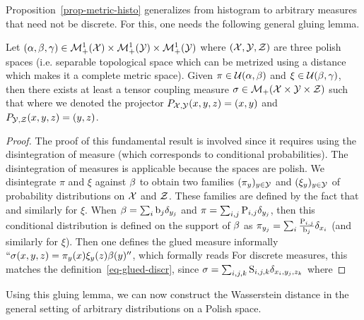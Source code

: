 Proposition~\ref{prop-metric-histo} generalizes from histogram to arbitrary measures that need not be discrete. For this, one needs the following general gluing lemma.

\begin{lem}\label{lem-gluing-general}
	Let $(\alpha,\beta,\gamma) \in \mathcal{M}_+^1(\mathcal{X}) \times \mathcal{M}_+^1(\mathcal{Y}) \times \mathcal{M}_+^1(\mathcal{Y})$
	where $(\mathcal{X},\mathcal{Y},\mathcal{Z})$ are three polish spaces (i.e. separable topological space which can be metrized using a distance which makes it a complete metric space).  
	Given $\pi \in \mathcal{U}(\alpha,\beta)$ and $\xi \in \mathcal{U}(\beta,\gamma)$, then there exists at least a tensor coupling measure
	$\sigma \in \mathcal{M}_+(\mathcal{X} \times \mathcal{Y} \times \mathcal{Z})$ such that 
	where we denoted the projector $P_{\mathcal{X},\mathcal{Y}}(x,y,z)=(x,y)$ and $P_{\mathcal{Y},\mathcal{Z}}(x,y,z)=(y,z)$. 
\end{lem}
\begin{proof}
	The proof of this fundamental result is involved since it requires using the disintegration of measure (which corresponds to conditional probabilities). 
	The disintegration of measures is applicable because the spaces are polish. 
	We disintegrate $\pi$ and $\xi$ against $\beta$ to obtain two families $(\pi_y)_{y \in \mathcal{Y}}$ and $(\xi_y)_{y \in \mathcal{Y}}$ of probability distributions on $\mathcal{X}$ and $\mathcal{Z}$. These families are defined by the fact that 
	and similarly for $\xi$.
	When $\beta=\sum_i \mathrm{b}_j \delta_{y_j}$ and $\pi=\sum_{i,j} \mathrm{P}_{i,j} \delta_{y_j}$, then this conditional distribution is defined on the support of $\beta$ as
	$\pi_{y_j} = \sum_i \frac{\mathrm{P}_{i,j}}{\mathrm{b}_j} \delta_{x_i}$ (and similarly for $\xi$).
	Then one defines the glued measure informally $``\sigma(x,y,z) = \pi_y(x) \xi_y(z) \beta(y)''$, which formally reads
	For discrete measures, this matches the definition~\eqref{eq-glued-discr}, since $\sigma=\sum_{i,j,k} \mathrm{S}_{i,j,k} \delta_{x_i,y_j,z_k}$ where
\end{proof}

Using this gluing lemma, we can now construct the Wasserstein distance in the general setting of arbitrary distributions on a Polish space.


